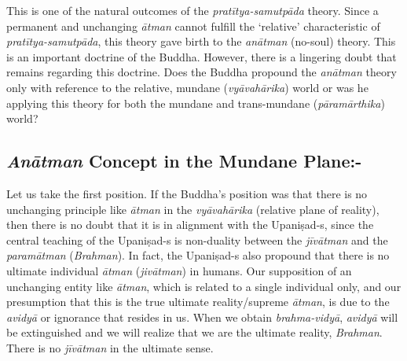 \vspace{-.3cm}

This is one of the natural outcomes of the \textit{pratītya-samutpāda} theory. Since a permanent and unchanging \textit{ātman} cannot fulfill the ‘relative’ characteristic of \textit{pratītya-samutpāda}, this theory gave birth to the \textit{anātman} (no-soul) theory. This is an important doctrine of the Buddha. However, there is a lingering doubt that remains regarding this doctrine. Does the Buddha propound the \textit{anātman} theory only with reference to the relative, mundane (\textit{vyāvahārika}) world or was he applying this theory for both the mundane and trans-mundane (\textit{pāramārthika}) world?

\vspace{-.3cm}

\subsection*{\textit{Anātman} Concept in the Mundane Plane:-}

Let us take the first position. If the Buddha’s position was that there is no unchanging principle like \textit{ātman} in the \textit{vyāvahārika} (relative plane of reality), then there is no doubt that it is in alignment with the Upaniṣad-s, since the central teaching of the Upaniṣad-s is non-duality between the \textit{jīvātman} and the \textit{paramātman} (\textit{Brahman}). In fact, the Upaniṣad-s also propound that there is no ultimate individual \textit{ātman} (\textit{jivātman}) in humans. Our supposition of an unchanging entity like \textit{ātman}, which is related to a single individual only, and our presumption that this is the true ultimate reality/supreme \textit{ātman}, is due to the \textit{avidyā} or ignorance that resides in us. When we obtain \textit{brahma-vidyā}, \textit{avidyā} will be extinguished and we will realize that we are the ultimate reality, \textit{Brahman}. There is no \textit{jīvātman} in the ultimate sense.

